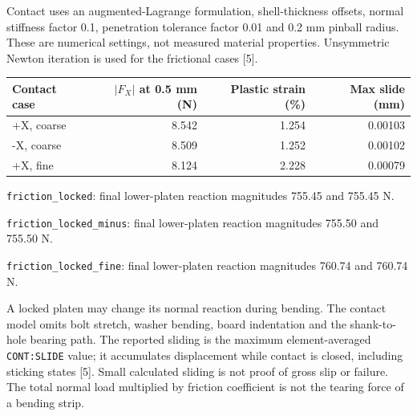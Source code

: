 \documentclass[10pt,a4paper]{article}
\newcommand{\ReportHeading}[1]{\par\vspace{7pt}{\large\bfseries\color{Teal}#1}\par\vspace{3pt}}
\begin{document}
Contact uses an augmented-Lagrange formulation, shell-thickness offsets, normal stiffness factor 0.1, penetration tolerance factor 0.01 and 0.2 mm pinball radius. These are numerical settings, not measured material properties. Unsymmetric Newton iteration is used for the frictional cases [5].
\begin{center}
\end{center}
\begin{center}\begin{tabular}{l r r r}\toprule
\textbf{Contact case} & \textbf{$|F_X|$ at 0.5 mm (N)} & \textbf{Plastic strain (\%)} & \textbf{Max slide (mm)}\\\midrule
+X, coarse & 8.542 & 1.254 & 0.00103 \\
-X, coarse & 8.509 & 1.252 & 0.00102 \\
+X, fine & 8.124 & 2.228 & 0.00079 \\
\bottomrule\end{tabular}\end{center}
\texttt{friction\_locked}: final lower-platen reaction magnitudes 755.45 and 755.45 N. 

\texttt{friction\_locked\_minus}: final lower-platen reaction magnitudes 755.50 and 755.50 N. 

\texttt{friction\_locked\_fine}: final lower-platen reaction magnitudes 760.74 and 760.74 N. 

\ReportHeading{Interpretation limits}
A locked platen may change its normal reaction during bending. The contact model omits bolt stretch, washer bending, board indentation and the shank-to-hole bearing path. The reported sliding is the maximum element-averaged \texttt{CONT:SLIDE} value; it accumulates displacement while contact is closed, including sticking states [5]. Small calculated sliding is not proof of gross slip or failure. The total normal load multiplied by friction coefficient is not the tearing force of a bending strip.
\end{document}
